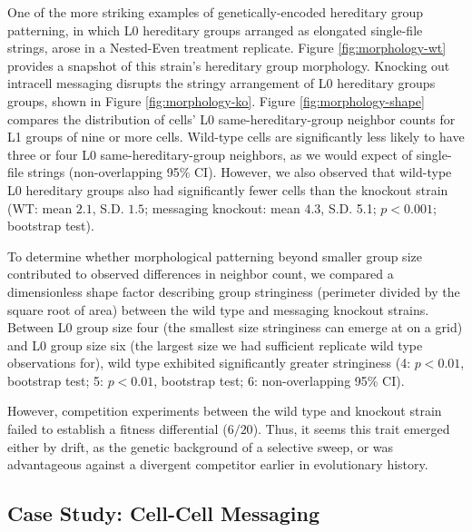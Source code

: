 One of the more striking examples of genetically-encoded hereditary group patterning, in which L0 hereditary groups arranged as elongated single-file strings, arose in a Nested-Even treatment replicate.
Figure \ref{fig:morphology-wt} provides a snapshot of this strain's hereditary group morphology.
Knocking out intracell messaging disrupts the stringy arrangement of L0 hereditary groups groups, shown in Figure \ref{fig:morphology-ko}.
Figure \ref{fig:morphology-shape} compares the distribution of cells' L0 same-hereditary-group neighbor counts for L1 groups of nine or more cells.
Wild-type cells are significantly less likely to have three or four L0 same-hereditary-group neighbors, as we would expect of single-file strings (non-overlapping 95\% CI).
However, we also observed that wild-type L0 hereditary groups also had significantly fewer cells than the knockout strain
(WT: mean $2.1$, S.D. $1.5$; messaging knockout: mean $4.3$, S.D. 5.1; $p < 0.001$; bootstrap test).

To determine whether morphological patterning beyond smaller group size contributed to observed differences in neighbor count, we compared a dimensionless shape factor describing group stringiness (perimeter divided by the square root of area) between the wild type and messaging knockout strains.
Between L0 group size four (the smallest size stringiness can emerge at on a grid) and L0 group size six (the largest size we had sufficient replicate wild type observations for), wild type exhibited significantly greater stringiness
(4: $p < 0.01$, bootstrap test; 5: $p < 0.01$, bootstrap test; 6: non-overlapping 95\% CI).

However, competition experiments between the wild type and knockout strain failed to establish a fitness differential ($6/20$).
Thus, it seems this trait emerged either by drift, as the genetic background of a selective sweep, or was advantageous against a divergent competitor earlier in evolutionary history.

\subsection{Case Study: Cell-Cell Messaging} \label{sec:intergroup}



